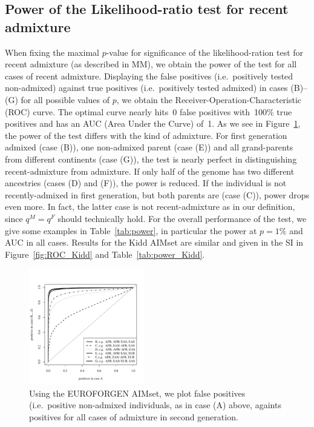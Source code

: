 \documentclass[12pt]{article}
\theoremstyle{definition}
\begin{document}
\subsection{Power of the Likelihood-ratio test for recent admixture}
When fixing the maximal $p$-value for significance of the
likelihood-ration test for recent admixture (as described in MM), we
obtain the power of the test for all cases of recent
admixture. Displaying the false positives (i.e.\ positively tested
non-admixed) against true positives (i.e.\ positively tested admixed)
in cases (B)--(G) for all possible values of $p$, we obtain the
Receiver-Operation-Characteristic (ROC) curve. The optimal curve
nearly hits~0 false positives with~100\% true positives and has an AUC
(Area Under the Curve) of~1. As we see in Figure~\ref{fig:ROC}, the
power of the test differs with the kind of admixture. For first
generation admixed (case (B)), one non-admixed parent (case (E)) and
all grand-parents from different continents (case (G)), the test is
nearly perfect in distinguishing recent-admixture from admixture. If
only half of the genome has two different ancestries (cases (D) and
(F)), the power is reduced. If the individual is not recently-admixed
in first generation, but both parents are (case (C)), power drops even
more. In fact, the latter case is not recent-admixture as in our
definition, since $q^M = q^F$ should technically hold. For the overall
performance of the test, we give some examples in
Table~\ref{tab:power}, in particular the power at $p=1\%$ and AUC in
all cases. Results for the Kidd AIMset are similar and given in the SI
in Figure~\ref{fig:ROC_Kidd} and Table~\ref{tab:power_Kidd}.

\begin{figure}[htb]
  \begin{center}
    \includegraphics[width=0.45\textwidth]{roc-curve-EUROFORGENE.pdf}
  \end{center}
  \caption{Using the EUROFORGEN AIMset, we plot false positives (i.e.\
    positive non-admixed individuals, as in case (A) above, againts
    positives for all cases of admixture in second generation.}
  \label{fig:ROC} 
\end{figure}
\end{document}
